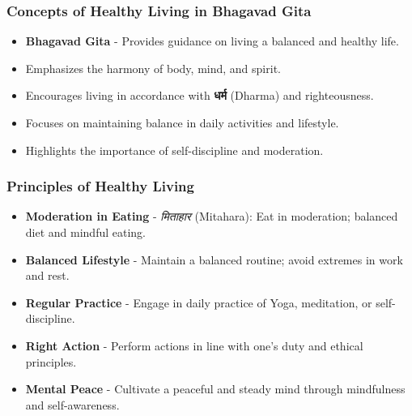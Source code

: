 \begin{frame}[fragile]\frametitle{Concepts of Healthy Living in Bhagavad Gita}

      \begin{itemize}
		\item \textbf{Bhagavad Gita} - Provides guidance on living a balanced and healthy life.
		\item Emphasizes the harmony of body, mind, and spirit.
		\item Encourages living in accordance with \textbf{धर्म} (Dharma) and righteousness.
		\item Focuses on maintaining balance in daily activities and lifestyle.
		\item Highlights the importance of self-discipline and moderation.
	  \end{itemize}

\end{frame}

\begin{frame}[fragile]\frametitle{Principles of Healthy Living}

      \begin{itemize}
		\item \textbf{Moderation in Eating} - \textit{मिताहार} (Mitahara): Eat in moderation; balanced diet and mindful eating.
		\item \textbf{Balanced Lifestyle} - Maintain a balanced routine; avoid extremes in work and rest.
		\item \textbf{Regular Practice} - Engage in daily practice of Yoga, meditation, or self-discipline.
		\item \textbf{Right Action} - Perform actions in line with one’s duty and ethical principles.
		\item \textbf{Mental Peace} - Cultivate a peaceful and steady mind through mindfulness and self-awareness.
	  \end{itemize}

\end{frame}

